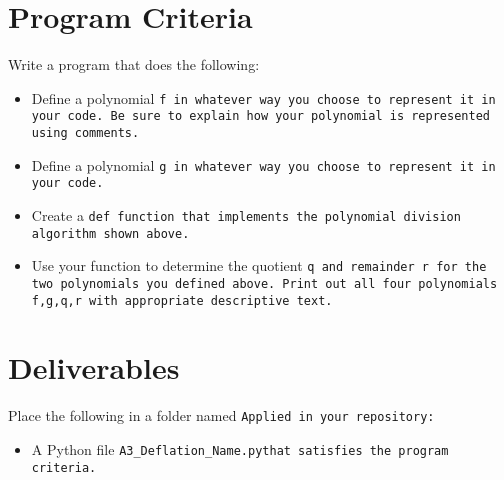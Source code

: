 \documentclass{article}
\newcommand\foldername{\tt{Applied} }
\newcommand\filename{\tt{A3\_Deflation\_Name.py}\;\;}
\begin{document}
\section*{Program Criteria}
	Write a program that does the following:
	\begin{itemize}
		\item Define a polynomial \tt{f} in whatever way you choose to represent it in your code.  Be sure to explain how your polynomial is represented  using comments.
		\item  Define a polynomial \tt{g} in whatever way you choose to represent it in your code.
		\item Create a \tt{def} function that implements the polynomial division algorithm shown above.
		\item Use your function to determine the quotient \tt{q} and remainder \tt{r} for the two polynomials you defined above.  Print out all four polynomials \tt{f,g,q,r} with appropriate descriptive text.
	\end{itemize}







\section*{Deliverables}
	
	
	Place the following in a folder named \foldername in your repository:
	\begin{itemize}
		\item A Python file \filename  that satisfies the program criteria.
	\end{itemize}

	
\end{document}
